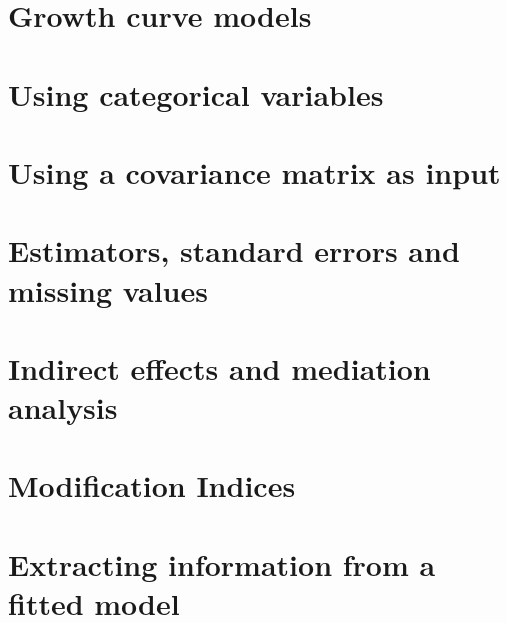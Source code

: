 \documentclass{article}
\begin{document}
\section{Growth curve models}

\section{Using categorical variables}

\section{Using a covariance matrix as input}

\section{Estimators, standard errors and missing values}

\section{Indirect effects and mediation analysis}

\section{Modification Indices}

\section{Extracting information from a fitted model}

\end{document}
